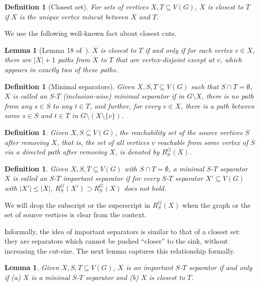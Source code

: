 \documentclass[11pt]{article}
\newtheorem{lemma}[theorem]{Lemma}
\newtheorem{definition}[theorem]{Definition}
\begin{document}
\begin{definition}[Closest set]
For sets of vertices $X,T\subseteq V(G)$, $X$ is closest to $T$ if $X$ is the unique vertex mincut between $X$ and $T$.
\end{definition}

We use the following well-known fact about closest cuts.

\begin{lemma}[Lemma 18 of~\cite{he2021near}]\label{lemma:closest}
$X$ is closest to $T$ if and only if for each vertex $v\in X$, there are $|X|+1$ paths from $X$ to $T$ that are vertex-disjoint except at $v$, which appears in exactly two of these paths.
\end{lemma}

\begin{definition}[Minimal separators]
Given $X, S, T \subseteq V(G)$ such that $S \cap T = \emptyset$, $X$ is called an $S$-$T$ (inclusion-wise) minimal separator if in $G \setminus X$, there is no path from any $s \in S$ to any $t \in T$, and further, for every $v \in X$, there is a path between some $s \in S$ and $t \in T$ in $G \setminus (X \setminus \{v\})$.
\end{definition}

\begin{definition}
Given $X, S \subseteq V(G)$, the reachability set of the source vertices $S$ after removing $X$, that is, the set of all vertices $v$ reachable from some vertex of $S$ via a directed path after removing $X$, is denoted by $R^G_S(X)$.\end{definition}



\begin{definition}
Given $X, S, T \subseteq V(G)$ with $S \cap T = \emptyset$, a minimal $S$-$T$ separator $X$ is called an $S$-$T$ important separator if for every $S$-$T$ separator $X' \subseteq V(G)$ with $|X'| \leq |X|$, $R^G_S(X') \supset R^G_S(X)$ does not hold.
\end{definition}

We will drop the subscript or the superscript in $R^G_S(X)$ when the graph or the set of source vertices is clear from the context.

Informally, the idea of important separators is similar to that of a closest set: they are separators which cannot be pushed ``closer'' to the sink, without increasing the cut-size. The next lemma captures this relationship formally.

\begin{lemma}\label{lemma:equivalence}
Given $X, S, T \subseteq V(G)$, $X$ is an important $S$-$T$ separator if and only if (a) $X$ is a  minimal $S$-$T$ separator and (b) $X$ is closest to $T$.
\end{lemma}
\end{document}
